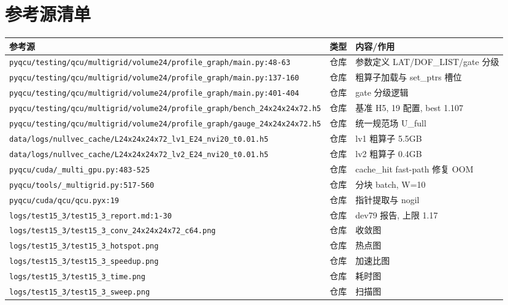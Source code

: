 \documentclass[UTF8]{ctexart}
\begin{document}
\section{参考源清单}
\begin{xltabular}{\textwidth}{llX}
\toprule
\textcolor{evidence}{参考源} & 类型 & 内容/作用 \\
\midrule
\endhead
\texttt{\nolinkurl{pyqcu/testing/qcu/multigrid/volume24/profile_graph/main.py:48-63}} & 仓库 & 参数定义 LAT/DOF\_LIST/gate 分级 \\
\texttt{\nolinkurl{pyqcu/testing/qcu/multigrid/volume24/profile_graph/main.py:137-160}} & 仓库 & 粗算子加载与 set\_ptrs 槽位 \\
\texttt{\nolinkurl{pyqcu/testing/qcu/multigrid/volume24/profile_graph/main.py:401-404}} & 仓库 & gate 分级逻辑 \\
\texttt{\nolinkurl{pyqcu/testing/qcu/multigrid/volume24/profile_graph/bench_24x24x24x72.h5}} & 仓库 & 基准 H5, 19 配置, best 1.107 \\
\texttt{\nolinkurl{pyqcu/testing/qcu/multigrid/volume24/profile_graph/gauge_24x24x24x72.h5}} & 仓库 & 统一规范场 U\_full \\
\texttt{\nolinkurl{data/logs/nullvec_cache/L24x24x24x72_lv1_E24_nvi20_t0.01.h5}} & 仓库 & lv1 粗算子 5.5GB \\
\texttt{\nolinkurl{data/logs/nullvec_cache/L24x24x24x72_lv2_E24_nvi20_t0.01.h5}} & 仓库 & lv2 粗算子 0.4GB \\
\texttt{\nolinkurl{pyqcu/cuda/_multi_gpu.py:483-525}} & 仓库 & cache\_hit fast-path 修复 OOM \\
\texttt{\nolinkurl{pyqcu/tools/_multigrid.py:517-560}} & 仓库 & 分块 batch, W=10 \\
\texttt{\nolinkurl{pyqcu/cuda/qcu/qcu.pyx:19}} & 仓库 & 指针提取与 nogil \\
\texttt{\nolinkurl{logs/test15_3/test15_3_report.md:1-30}} & 仓库 & dev79 报告, 上限 1.17 \\
\texttt{\nolinkurl{logs/test15_3/test15_3_conv_24x24x24x72_c64.png}} & 仓库 & 收敛图 \\
\texttt{\nolinkurl{logs/test15_3/test15_3_hotspot.png}} & 仓库 & 热点图 \\
\texttt{\nolinkurl{logs/test15_3/test15_3_speedup.png}} & 仓库 & 加速比图 \\
\texttt{\nolinkurl{logs/test15_3/test15_3_time.png}} & 仓库 & 耗时图 \\
\texttt{\nolinkurl{logs/test15_3/test15_3_sweep.png}} & 仓库 & 扫描图 \\

\end{xltabular}
\end{document}
